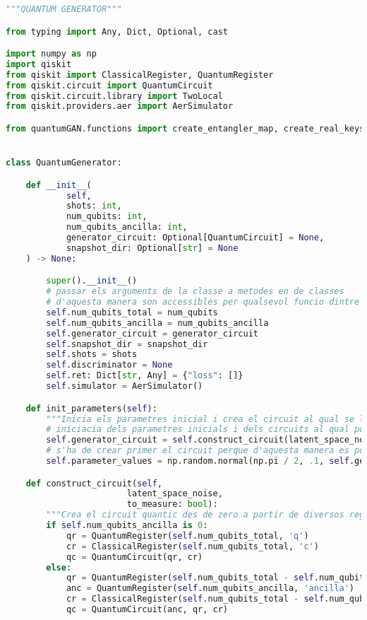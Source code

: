 \begin{lstlisting}[language=Python, caption=Codi final pel generador]
"""QUANTUM GENERATOR"""

from typing import Any, Dict, Optional, cast

import numpy as np
import qiskit
from qiskit import ClassicalRegister, QuantumRegister
from qiskit.circuit import QuantumCircuit
from qiskit.circuit.library import TwoLocal
from qiskit.providers.aer import AerSimulator

from quantumGAN.functions import create_entangler_map, create_real_keys, minimax_generator


class QuantumGenerator:

	def __init__(
			self,
			shots: int,
			num_qubits: int,
			num_qubits_ancilla: int,
			generator_circuit: Optional[QuantumCircuit] = None,
			snapshot_dir: Optional[str] = None
	) -> None:

		super().__init__()
		# passar els arguments de la classe a metodes en de classes
		# d'aquesta manera son accessibles per qualsevol funcio dintre de la classe
		self.num_qubits_total = num_qubits
		self.num_qubits_ancilla = num_qubits_ancilla
		self.generator_circuit = generator_circuit
		self.snapshot_dir = snapshot_dir
		self.shots = shots
		self.discriminator = None
		self.ret: Dict[str, Any] = {"loss": []}
		self.simulator = AerSimulator()

	def init_parameters(self):
		"""Inicia els parametres inicial i crea el circuit al qual se li posen els parametres"""
		# iniciacia dels parametres inicials i dels circuits al qual posar aquests parametres
		self.generator_circuit = self.construct_circuit(latent_space_noise=None, to_measure=False)
		# s'ha de crear primer el circuit perque d'aquesta manera es pot saber el nombre de parametres que es necessiten
		self.parameter_values = np.random.normal(np.pi / 2, .1, self.generator_circuit.num_parameters)

	def construct_circuit(self,
						latent_space_noise,
						to_measure: bool):
		"""Crea el circuit quantic des de zero a partir de diversos registres de qubits"""
		if self.num_qubits_ancilla is 0:
			qr = QuantumRegister(self.num_qubits_total, 'q')
			cr = ClassicalRegister(self.num_qubits_total, 'c')
			qc = QuantumCircuit(qr, cr)
		else:
			qr = QuantumRegister(self.num_qubits_total - self.num_qubits_ancilla, 'q')
			anc = QuantumRegister(self.num_qubits_ancilla, 'ancilla')
			cr = ClassicalRegister(self.num_qubits_total - self.num_qubits_ancilla, 'c')
			qc = QuantumCircuit(anc, qr, cr)


\end{lstlisting}
